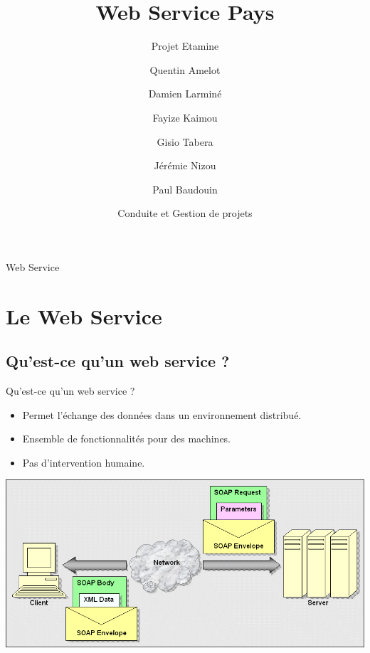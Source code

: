 \documentclass{beamer}
\title[Web Service Pays] %
{Web Service Pays}
\subtitle
{Projet Etamine}
\author{Quentin Amelot \and Damien Larminé \and Fayize Kaimou  \\ \and Gisio Tabera \and Jérémie Nizou \and Paul Baudouin}
\institute[Université Paris 13] %
{Master 1 Informatique \\ Université Paris 13}
\date[C&P 17/04/2015] %
{Conduite et Gestion de projets}
\begin{document}
\begin{frame}
  \titlepage
\end{frame}

\begin{frame}{Web Service}
  \tableofcontents
\end{frame}





\section{Le Web Service}

\subsection{Qu'est-ce qu'un web service ?}

\begin{frame}{Qu'est-ce qu'un web service ?}

  \begin{itemize}
  \item
   Permet l'échange des données dans un environnement distribué.
  \item
    Ensemble de fonctionnalités pour des machines.
  \item
    Pas d'intervention humaine.
  \end{itemize}

\includegraphics[scale = 0.25]{images/WS}

\end{frame}
\end{document}
